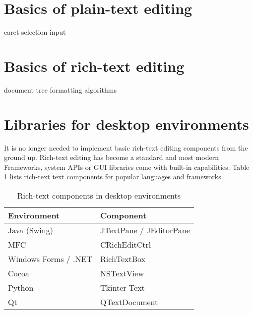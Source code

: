 
\section{Basics of plain-text editing} %

caret
selection
input

\section{Basics of rich-text editing} %

document tree
formatting algorithms


\section{Libraries for desktop environments}

It is no longer needed to implement basic rich-text editing components from the ground up. Rich-text editing has become a standard and most modern Frameworks, system APIs or GUI libraries come with built-in capabilities. Table \ref{table:rich-text-components-desktop} lists rich-text text components for popular languages and frameworks.

\begin{table}[]
\centering
\begin{tabular}{ll}
\hline
Environment & Component \\ \hline
Java (Swing) & JTextPane / JEditorPane \\
MFC & CRichEditCtrl \\
Windows Forms / .NET & RichTextBox \\
Cocoa & NSTextView \\
Python & Tkinter Text \\
Qt & QTextDocument \\ \hline
\end{tabular}
\caption{Rich-text components in desktop environments}
\label{table:rich-text-components-desktop}
\end{table}